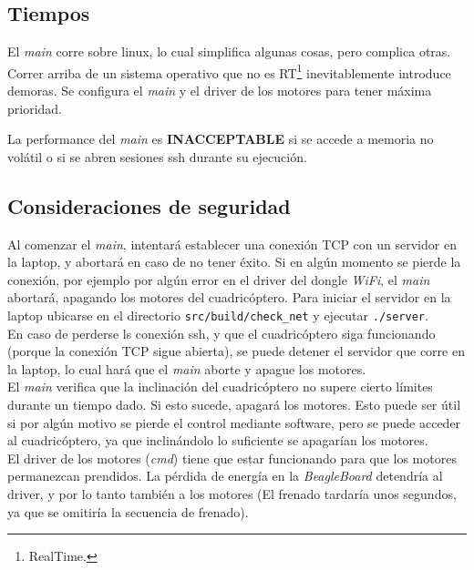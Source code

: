 \documentclass[main]{subfiles}
\begin{document}
\subsection{Tiempos}
\label{sec:codigo:tiempos}

El \textit{main} corre sobre linux, lo cual simplifica algunas cosas, pero complica otras. Correr arriba de un sistema operativo que no es RT\footnote{RealTime.} inevitablemente introduce demoras. Se configura el \textit{main} y el driver de los motores para tener m\'axima prioridad.

La performance del \textit{main} es \textbf{INACCEPTABLE} si se accede a memoria no vol\'atil o si se abren sesiones ssh durante su ejecución.

\subsection{Consideraciones de seguridad}
\label{sec:codigo:consideraciones-de-seguridad}

Al comenzar el \textit{main}, intentará establecer una conexión TCP con un servidor en la laptop, y abortará en caso de no tener éxito. Si en algún momento se pierde la conexión, por ejemplo por algún error en el driver del dongle \textit{WiFi}, el \textit{main} abortará, apagando los motores del cuadricóptero. Para iniciar el servidor en la laptop ubicarse en el directorio \verb+src/build/check_net+ y ejecutar \verb+./server+.\\

En caso de perderse ls conexión ssh, y que el cuadricóptero siga funcionando (porque la conexión TCP sigue abierta), se puede detener el servidor que corre en la laptop, lo cual hará que el \textit{main} aborte y apague los motores.\\

El \textit{main} verifica que la inclinaci\'on del cuadric\'optero no supere cierto l\'imites durante un tiempo dado. Si esto sucede, apagar\'a los motores. Esto puede ser \'util si por alg\'un motivo se pierde el control mediante software, pero se puede acceder al cuadric\'optero, ya que inclin\'andolo lo suficiente se apagar\'ian los motores.\\

El driver de los motores (\textit{cmd}) tiene que estar funcionando para que los motores permanezcan prendidos. La p\'erdida de energ\'ia en la \textit{BeagleBoard} detendr\'ia al driver, y por lo tanto tambi\'en a los motores (El frenado tardar\'ia unos segundos, ya que se omitir\'ia la secuencia de frenado).
\end{document}

